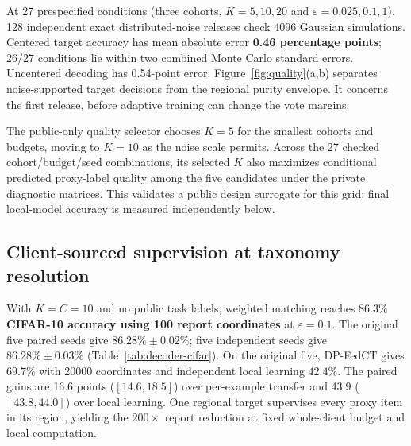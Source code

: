 At 27 prespecified conditions (three cohorts, $K=5,10,20$ and
$\varepsilon=0.025,0.1,1$), 128 independent exact distributed-noise releases
check 4096 Gaussian simulations. Centered target accuracy has mean absolute
error \textbf{0.46 percentage points}; 26/27 conditions lie within two combined
Monte Carlo standard errors. Uncentered decoding has 0.54-point error.
Figure~\ref{fig:quality}(a,b) separates noise-supported target decisions from
the regional purity envelope. It concerns the first release, before adaptive
training can change the vote margins.

The public-only quality selector chooses $K=5$ for the smallest cohorts and
budgets, moving to $K=10$ as the noise scale permits. Across the 27 checked
cohort/budget/seed combinations, its selected $K$ also maximizes conditional
predicted proxy-label quality among the five candidates under the private
diagnostic matrices. This validates a public design surrogate for this grid;
final local-model accuracy is measured independently below.

\subsection{Client-sourced supervision at taxonomy resolution}
\label{sec:eval:main}

With $K=C=10$ and no public task labels, weighted matching reaches
\textbf{$86.3\%$ CIFAR-10 accuracy using 100 report coordinates} at
$\varepsilon=0.1$. The original five paired seeds give
$86.28\%\pm0.02\%$; five independent seeds give
$86.28\%\pm0.03\%$ (Table~\ref{tab:decoder-cifar}). On the original five,
DP-FedCT gives $69.7\%$ with 20000 coordinates and independent local learning
$42.4\%$. The paired gains are 16.6 points ($[14.6,18.5]$) over per-example
transfer and 43.9 ($[43.8,44.0]$) over local learning. One regional target
supervises every proxy item in its region, yielding the $200\times$ report
reduction at fixed whole-client budget and local computation.



